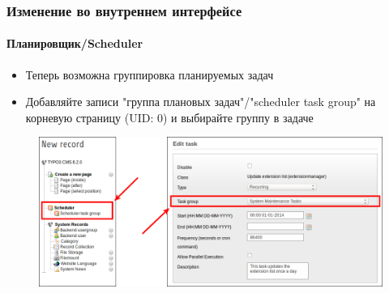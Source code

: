 \begin{frame}[fragile]
	\frametitle{Изменение во внутреннем интерфейсе}
	\framesubtitle{Планировщик/Scheduler}

	\begin{itemize}
		\item Теперь возможна группировка планируемых задач
		\item Добавляйте записи "группа плановых задач"/"scheduler task group" на корневую страницу (UID: 0) и выбирайте группу
		 в задаче
	\end{itemize}

	\begin{figure}
		\includegraphics[width=0.85\linewidth]{Images/BackendChanges/SchedulerTaskGroup.png}
	\end{figure}

\end{frame}


